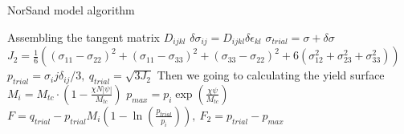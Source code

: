 \documentclass{article}
\begin{document}
	\begin{algorithm}
		\caption{NorSand model algorithm}
		\begin{algorithmic}[1]
			\State Assembling the tangent matrix $ D_{ijkl}$
			\State $ \delta\sigma_{ij} = D_{ijkl} \delta\epsilon_{kl}$
			\State $\sigma_{trial}=\sigma+\delta\sigma$ 
			\State $J_2=\frac{1}{6}((\sigma_{11}-\sigma_{22})^2+(\sigma_{11}-\sigma_{33})^2+(\sigma_{33}-\sigma_{22})^2+6(\sigma_{12}^{2}+\sigma_{23}^{2}+\sigma_{33}^{2}))$
			\State $p_{trial} = \sigma_ij\delta_{ij}/3, \ q_{trial}=\sqrt{3J_2}$
			\State Then we going to calculating the yield surface
			\State $M_i=M_{tc}\cdot(1-\frac{\chi N | \psi |}{M_{tc}})$
			\State $ p_{max}=p_i\exp{(\frac{\chi\psi}{M_{tc}})}$
			\State $F=q_{trial}-p_{trial}M_i(1-\ln(\frac{p_{trial}}{p_{i}})), 
					\ F_2=p_{trial}-p_{max}$
			
			
		\end{algorithmic}
	\end{algorithm}
\end{document}
